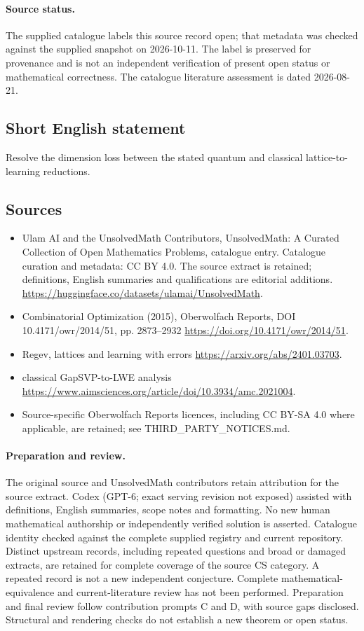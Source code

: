 \documentclass[11pt]{article}
\begin{document}
\paragraph{Source status.}
The supplied catalogue labels this source record open; that metadata was checked against the supplied snapshot on 2026-10-11. The label is preserved for provenance and is not an independent verification of present open status or mathematical correctness. The catalogue literature assessment is dated 2026-08-21.
\subsection{Short English statement}
Resolve the dimension loss between the stated quantum and classical lattice-to-learning reductions.
\subsection{Sources}
\begin{itemize}
\item[\hypertarget{source:statement:1}{S1}] Ulam AI and the UnsolvedMath Contributors, UnsolvedMath: A Curated Collection of Open Mathematics Problems, catalogue entry. Catalogue curation and metadata: CC BY 4.0. The source extract is retained; definitions, English summaries and qualifications are editorial additions.
\url{https://huggingface.co/datasets/ulamai/UnsolvedMath}.
\item[\hypertarget{source:statement:2}{S2}] Combinatorial Optimization (2015), Oberwolfach Reports, DOI 10.4171/owr/2014/51, pp. 2873--2932
\url{https://doi.org/10.4171/owr/2014/51}.
\item[\hypertarget{source:statement:3}{S3}] Regev, lattices and learning with errors
\url{https://arxiv.org/abs/2401.03703}.
\item[\hypertarget{source:statement:4}{S4}] classical GapSVP-to-LWE analysis
\url{https://www.aimsciences.org/article/doi/10.3934/amc.2021004}.
\item Source-specific Oberwolfach Reports licences, including CC BY-SA 4.0 where applicable, are retained; see THIRD\_PARTY\_NOTICES.md.
\end{itemize}
\paragraph{Preparation and review.}
The original source and UnsolvedMath contributors retain attribution for the source extract. Codex (GPT-6; exact serving revision not exposed) assisted with definitions, English summaries, scope notes and formatting. No new human mathematical authorship or independently verified solution is asserted. Catalogue identity checked against the complete supplied registry and current repository. Distinct upstream records, including repeated questions and broad or damaged extracts, are retained for complete coverage of the source CS category. A repeated record is not a new independent conjecture. Complete mathematical-equivalence and current-literature review has not been performed. Preparation and final review follow contribution prompts C and D, with source gaps disclosed. Structural and rendering checks do not establish a new theorem or open status.
\label{end:statement}
\end{document}
